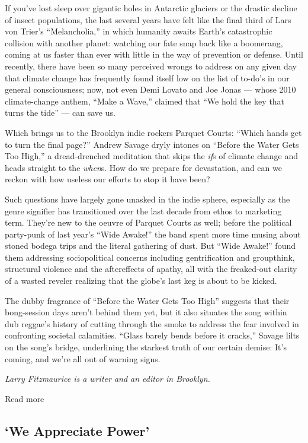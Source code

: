 If you've lost sleep over gigantic holes in Antarctic glaciers or the
drastic decline of insect populations, the last several years have felt
like the final third of Lars von Trier's ``Melancholia,'' in which
humanity awaits Earth's catastrophic collision with another planet:
watching our fate snap back like a boomerang, coming at us faster than
ever with little in the way of prevention or defense. Until recently,
there have been so many perceived wrongs to address on any given day
that climate change has frequently found itself low on the list of
to-do's in our general consciousness; now, not even Demi Lovato and Joe
Jonas --- whose 2010 climate-change anthem, ``Make a Wave,'' claimed
that ``We hold the key that turns the tide'' --- can save us.

Which brings us to the Brooklyn indie rockers Parquet Courts: ``Which
hands get to turn the final page?'' Andrew Savage dryly intones on
``Before the Water Gets Too High,'' a dread-drenched meditation that
skips the \emph{if}s of climate change and heads straight to the
\emph{when}s. How do we prepare for devastation, and can we reckon with
how useless our efforts to stop it have been?

Such questions have largely gone unasked in the indie sphere, especially
as the genre signifier has transitioned over the last decade from ethos
to marketing term. They're new to the oeuvre of Parquet Courts as well;
before the political party-punk of last year's ``Wide Awake!'' the band
spent more time musing about stoned bodega trips and the literal
gathering of dust. But ``Wide Awake!'' found them addressing
sociopolitical concerns including gentrification and groupthink,
structural violence and the aftereffects of apathy, all with the
freaked-out clarity of a wasted reveler realizing that the globe's last
keg is about to be kicked.

The dubby fragrance of ``Before the Water Gets Too High'' suggests that
their bong-session days aren't behind them yet, but it also situates the
song within dub reggae's history of cutting through the smoke to address
the fear involved in confronting societal calamities. ``Glass barely
bends before it cracks,'' Savage lilts on the song's bridge, underlining
the starkest truth of our certain demise: It's coming, and we're all out
of warning signs.

\emph{Larry Fitzmaurice is a writer and an editor in Brooklyn.}

Read more

\hypertarget{--we-appreciate-power}{%
\subsection{\texorpdfstring{ `We Appreciate
Power'}{  `We Appreciate Power'}}\label{--we-appreciate-power}}

